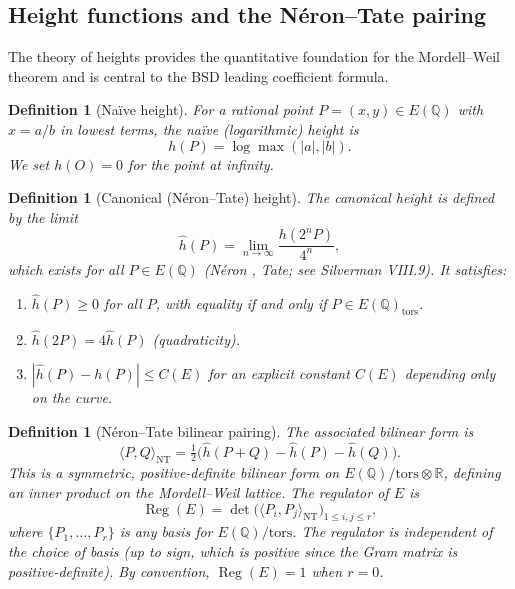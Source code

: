 \documentclass[11pt]{article}
\newtheorem{definition}[theorem]{Definition}
\DeclareMathOperator{\Reg}{Reg}
\begin{document}
\subsection{Height functions and the N\'eron--Tate pairing}
\label{subsec:heights}

The theory of heights provides the quantitative foundation for the Mordell--Weil
theorem and is central to the BSD leading coefficient formula.

\begin{definition}[Na\"ive height]
For a rational point $P = (x,y) \in E(\mathbb{Q})$ with $x = a/b$ in lowest
terms, the \emph{na\"ive (logarithmic) height} is
\[
  h(P) = \log \max(|a|, |b|).
\]
We set $h(O) = 0$ for the point at infinity.
\end{definition}

\begin{definition}[Canonical (N\'eron--Tate) height]
\label{def:NT-height}
The \emph{canonical height} is defined by the limit
\[
  \hat{h}(P) = \lim_{n \to \infty} \frac{h(2^n P)}{4^n},
\]
which exists for all $P \in E(\mathbb{Q})$ (N\'eron \cite{Neron},
Tate; see Silverman \cite{SilvI} VIII.9).  It satisfies:
\begin{enumerate}
  \item $\hat{h}(P) \geq 0$ for all $P$, with equality if and only if
    $P \in E(\mathbb{Q})_{\mathrm{tors}}$.
  \item $\hat{h}(2P) = 4\hat{h}(P)$ (quadraticity).
  \item $|\hat{h}(P) - h(P)| \leq C(E)$ for an explicit constant $C(E)$
    depending only on the curve.
\end{enumerate}
\end{definition}

\begin{definition}[N\'eron--Tate bilinear pairing]
The associated bilinear form is
\[
  \langle P, Q \rangle_{\mathrm{NT}} =
  \tfrac{1}{2}\bigl(\hat{h}(P+Q) - \hat{h}(P) - \hat{h}(Q)\bigr).
\]
This is a symmetric, positive-definite bilinear form on
$E(\mathbb{Q})/\mathrm{tors} \otimes \mathbb{R}$, defining an inner product
on the Mordell--Weil lattice.  The \emph{regulator} of $E$ is
\[
  \Reg(E) = \det\bigl(\langle P_i, P_j \rangle_{\mathrm{NT}}\bigr)_{1 \leq i,j \leq r},
\]
where $\{P_1, \ldots, P_r\}$ is any basis for $E(\mathbb{Q})/\mathrm{tors}$.
The regulator is independent of the choice of basis (up to sign, which is
positive since the Gram matrix is positive-definite).  By convention,
$\Reg(E) = 1$ when $r = 0$.
\end{definition}
\end{document}
